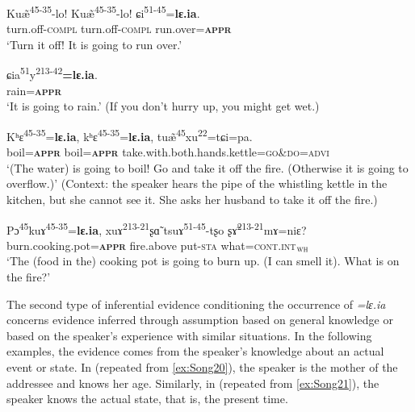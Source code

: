 \documentclass[output=paper,colorlinks,citecolor=brown, language=chinese]{langscibook}
\begin{document}
\ea\label{ex:Song27} %
\gll Ku\~æ\textsuperscript{45-35}-lo! Ku\~æ\textsuperscript{45-35}-lo! ɕi\textsuperscript{51-45}=\textbf{lɛ.ia}. \\
turn.off-\textsc{compl} turn.off-\textsc{compl} run.over=\textsc{\textbf{appr}} \\
\glt `Turn it off! It is going to run over.'
\z


\ea\label{ex:Song28}%
\gll ɕia\textsuperscript{51}y\textsuperscript{213-42}\textbf{=lɛ.ia}. \\
rain=\textsc{\textbf{appr}}\\
\glt `It is going to rain.' (If you don't hurry up, you might get wet.)
\z

\ea\label{ex:Song29}
\gll Kʰɛ\textsuperscript{45-35}=\textbf{lɛ.ia}, kʰɛ\textsuperscript{45-35}=\textbf{lɛ.ia}, tu\~æ\textsuperscript{45}xu\textsuperscript{22}=tɕi=pa. \\
boil=\textsc{\textbf{appr}} boil=\textsc{\textbf{appr}} take.with.both.hands.kettle=\textsc{go\&do=advi} \\
\glt `(The water) is going to boil! Go and take it off the fire. (Otherwise it is going to overflow.)' (Context: the speaker hears the pipe of the whistling kettle in the kitchen, but she cannot see it. She asks her husband to take it off the fire.)
\z


\ea\label{ex:Song30}
\gll Pɔ\textsuperscript{45}kuɤ\textsuperscript{45-35}=\textbf{lɛ.ia}, xuɤ\textsuperscript{213-21}ʂ\~ɑ tsuɤ\textsuperscript{51-45}-tʂo ʂ\~ɤ\textsuperscript{213-21}mɤ=niɛ? \\
burn.cooking.pot=\textsc{\textbf{appr}} fire.above put-\textsc{sta} what=\textsc{cont.int$_{\textsc{wh}}$} \\
\glt `The (food in the) cooking pot is going to burn up. (I can smell it). What is on the fire?'
\z

 The second type of inferential evidence conditioning the occurrence of \textit{=lɛ.ia} concerns evidence inferred through assumption based on general knowledge or based on the speaker's experience with similar situations. In the following examples, the evidence comes from the speaker's knowledge about an actual event or state. In   (repeated from \ref{ex:Song20}), the speaker is the mother of the addressee and knows her age. Similarly, in  (repeated from \ref{ex:Song21}),  the speaker knows the actual state, that is, the present time.
\end{document}

